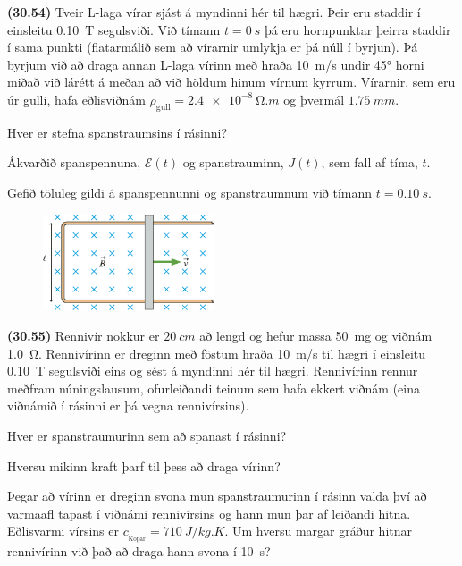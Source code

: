 \ifdefined \wholebook \else\documentclass[oneside]{book}\usepackage{EdlBook}\graphicspath{{figures/}}
\begin{document}
\begin{enumerate}[label = \textbf{(\alph*)}]
\begin{minipage}{\linewidth}
\item[\textbf{(30.54)}] Tveir L-laga vírar sjást á myndinni hér til hægri. Þeir eru staddir í einsleitu \SI{0.10}{T} segulsviði. Við tímann $t = \SI{0}{s}$ þá eru hornpunktar þeirra staddir í sama punkti (flatarmálið sem að vírarnir umlykja er þá núll í byrjun). Þá byrjum við að draga annan L-laga vírinn með hraða \SI{10}{m/s} undir \ang{45} horni miðað við lárétt á meðan að við höldum hinum vírnum kyrrum. Vírarnir, sem eru úr gulli, hafa eðlisviðnám $\rho_{\text{gull}} = \SI{2.4e-8}{\ohm.m}$ og þvermál $\SI{1.75}{mm}$. \begin{enumerate*}[label = \textbf{(\alph*)}]
    \item Hver er stefna spanstraumsins í rásinni?
    \item Ákvarðið spanspennuna, $\mathcal{E}(t)$ og spanstrauminn, $J(t)$, sem fall af tíma, $t$.
    \item Gefið töluleg gildi á spanspennunni og spanstraumnum við tímann $t = \SI{0.10}{s}$.
\end{enumerate*}

\end{minipage}

\vspace{0.3cm}


\begin{minipage}{\linewidth}
\begin{figure}
\vspace{-0.25cm}
\includegraphics[width = 2in]{figures/rk3026b.pdf}
\end{figure}

\item[\textbf{(30.55)}]  Rennivír nokkur er $\SI{20}{cm}$ að lengd og hefur massa \SI{50}{mg} og viðnám \SI{1.0}{\ohm}. Rennivírinn er dreginn með föstum hraða \SI{10}{m/s} til hægri í einsleitu \SI{0.10}{T} segulsviði eins og sést á myndinni hér til hægri. Rennivírinn rennur meðfram núningslausum, ofurleiðandi teinum sem hafa ekkert viðnám (eina viðnámið í rásinni er þá vegna rennivírsins). \begin{enumerate*}[label = \textbf{(\alph*)}]
    \item Hver er spanstraumurinn sem að spanast í rásinni?
    \item Hversu mikinn kraft þarf til þess að draga vírinn?
    \item Þegar að vírinn er dreginn svona mun spanstraumurinn í rásinn valda því að varmaafl tapast í viðnámi rennivírsins og hann mun þar af leiðandi hitna. Eðlisvarmi vírsins er $c_{\!_\text{Kopar}} = \SI{710}{J/kg.K}$. Um hversu margar gráður hitnar rennivírinn við það að draga hann svona í \SI{10}{s}?
\end{enumerate*}


\end{minipage}
\end{enumerate}
\end{document}
